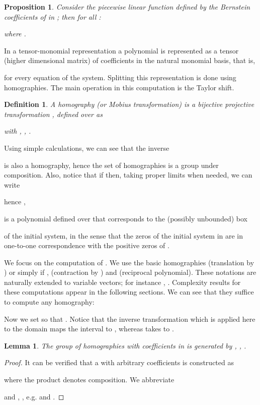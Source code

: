 \documentclass{sig-alternate}
\newtheorem{lemma}[theorem]{Lemma}
\newtheorem{proposition}[theorem]{Proposition}
\newtheorem{definition}[theorem]{Definition}\newtheorem{dxample}[theorem]{Example}
\begin{document}
\begin{proposition} \label{quad_convergence}
Consider the piecewise linear function  defined by the Bernstein coefficients of  in ; then for all :

where .  \end{proposition}
\fi

In a tensor-monomial representation a polynomial is represented as a
tensor (higher dimensional matrix) of coefficients in the natural
monomial basis, that is,

for every equation  of the system.  Splitting this
representation is done using homographies. The main operation in this
computation is the Taylor shift.

\begin{definition}
  A homography (or Mobius transformation) is a bijective projective
  transformation ,
  defined over  as
 
with , , . 
\end{definition}
Using simple calculations, we can see that the inverse

is also a homography, hence the set of homographies is a group under
composition.  Also, notice that if  then, taking
proper limits when needed, we can write

hence , 

is a polynomial defined
over  that corresponds to the (possibly unbounded) box 

of the initial system, in the sense that the zeros of the initial
system in  are in one-to-one correspondence with the positive
zeros of .

We focus on the computation of . 
We use the basic homographies 
(translation by ) or simply  if ,  (contraction by ) and  (reciprocal polynomial).
These notations are naturally extended to variable vectors; for instance
, .
Complexity results for these computations appear in the following sections.
We can see that they suffice to compute any homography:

Now we set  so that .
Notice that the inverse transformation  which is applied here to the domain maps the interval
 to ,
whereas  takes  to .
\fi

\begin{lemma}
The group of homographies with coefficients in  is generated by , , .
\end{lemma}
\begin{proof}
It can be verified that a  with arbitrary coefficients  is constructed as

where the product denotes composition.  We abbreviate 
 
and 
, ,
e.g.  and .


\end{proof}
\end{document}
